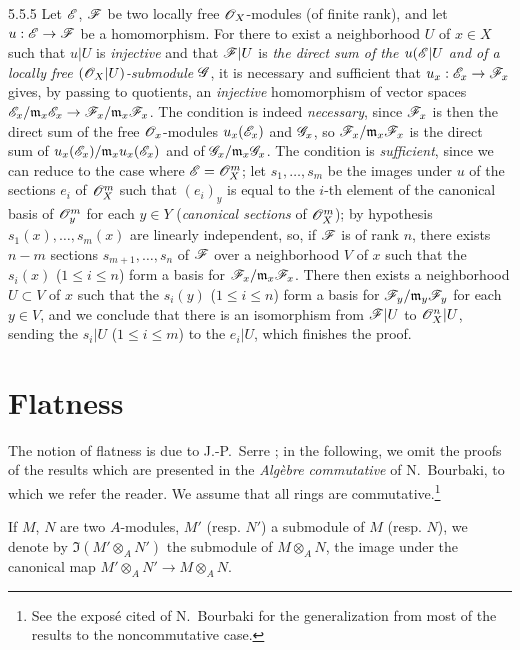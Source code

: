 \begin{env}{5.5.5}
\label{env-0.5.5.5}
Let $\mathscr{E}$, $\mathscr{F}$ be two locally free $\mathscr{O}_X$-modules (of finite rank), and let
$u:\mathscr{E}\to\mathscr{F}$ be a homomorphism. For there to exist a neighborhood $U$ of $x\in X$ such
that $u|U$ is \emph{injective} and that $\mathscr{F}|U$ is \emph{the direct sum of the
$u(\mathscr{E}|U$ and of a locally free $(\mathscr{O}_X|U)$-submodule $\mathscr{G}$}, it is necessary and
sufficient that $u_x:\mathscr{E}_x\to\mathscr{F}_x$ gives, by passing to quotients, an \emph{injective}
homomorphism of vector spaces
$\mathscr{E}_x/\mathfrak{m}_x\mathscr{E}_x\to\mathscr{F}_x/\mathfrak{m}_x\mathscr{F}_x$. The condition is indeed
\emph{necessary}, since $\mathscr{F}_x$ is then the direct sum of the free $\mathscr{O}_x$-modules
$u_x(\mathscr{E}_x)$ and $\mathscr{G}_x$, so $\mathscr{F}_x/\mathfrak{m}_x\mathscr{F}_x$ is the direct sum of
$u_x(\mathscr{E}_x)/\mathfrak{m}_x u_x(\mathscr{E}_x)$ and of $\mathscr{G}_x/\mathfrak{m}_x\mathscr{G}_x$. The
condition is \emph{sufficient}, since we can reduce to the case where $\mathscr{E}=\mathscr{O}_X^m$; let
$s_1,\dots,s_m$ be the images under $u$ of the sections $e_i$ of $\mathscr{O}_X^m$ such that
$(e_i)_y$ is equal to the $i$-th element of the canonical basis of $\mathscr{O}_y^m$ for each
$y\in Y$ (\emph{canonical sections} of $\mathscr{O}_X^m$); by hypothesis $s_1(x),\dots,s_m(x)$ are
linearly independent, so, if $\mathscr{F}$ is of rank $n$, there exists $n-m$ sections
$s_{m+1},\dots,s_n$ of $\mathscr{F}$ over a neighborhood $V$ of $x$ such that the $s_i(x)$
($1\leqslant i\leqslant n$) form a basis for $\mathscr{F}_x/\mathfrak{m}_x\mathscr{F}_x$. There then
exists  a neighborhood $U\subset V$ of $x$ such that the $s_i(y)$
($1\leqslant i\leqslant n$) form a basis for $\mathscr{F}_y/\mathfrak{m}_y\mathscr{F}_y$ for each
$y\in V$, and we conclude  that there is an isomorphism from $\mathscr{F}|U$ to
$\mathscr{O}_X^n|U$, sending the $s_i|U$ ($1\leqslant i\leqslant m$) to the $e_i|U$, which finishes
the proof.
\end{env}

\section{Flatness}
\label{0-prelim-6}

\begin{env}{6.0}
\label{env-0.6.0.0}
The notion of flatness is due to J.-P.~Serre \cite{16}; in the following, we omit the
proofs of the results which are presented in the \emph{Alg\`ebre commutative} of N.~Bourbaki,
to which we refer the reader. We assume that all rings are commutative.\footnote{See the
expos\'e cited of N.~Bourbaki for the generalization from most of the results to the
noncommutative case.}

If $M$, $N$ are two $A$-modules, $M'$ (resp. $N'$) a submodule of $M$ (resp. $N$), we denote
by $\Im(M'\otimes_A N')$ the submodule of $M\otimes_A N$, the image under the canonical map
$M'\otimes_A N'\to M\otimes_A N$.
\end{env}

